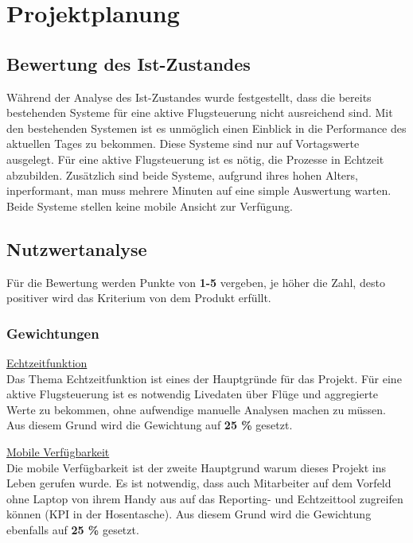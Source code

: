 \section{Projektplanung}

	\subsection{Bewertung des Ist-Zustandes}
	Während der Analyse des Ist-Zustandes wurde festgestellt, dass die bereits bestehenden Systeme für eine aktive Flugsteuerung nicht ausreichend sind. Mit den bestehenden Systemen ist es unmöglich einen Einblick in die Performance des aktuellen Tages zu bekommen. Diese Systeme sind nur auf Vortagswerte ausgelegt. Für eine aktive Flugsteuerung ist es nötig, die Prozesse in Echtzeit abzubilden. Zusätzlich sind beide Systeme, aufgrund ihres hohen Alters, inperformant, man muss mehrere Minuten auf eine simple Auswertung warten. Beide Systeme stellen keine mobile Ansicht zur Verfügung.


	
	\subsection{Nutzwertanalyse}
	Für die Bewertung werden Punkte von \textbf{1-5} vergeben, je höher die Zahl, desto positiver wird das Kriterium von dem Produkt erfüllt.

		\subsubsection{Gewichtungen}

		{
			\underline{Echtzeitfunktion}\\
			Das Thema Echtzeitfunktion ist eines der Hauptgründe für das Projekt. Für eine aktive Flugsteuerung ist es notwendig Livedaten über Flüge und aggregierte Werte zu bekommen, ohne aufwendige manuelle Analysen machen zu müssen. Aus diesem Grund wird die Gewichtung auf \textbf{25 \%} gesetzt.
		
		}

		\vspace{8pt}

		{
			\noindent
			\underline{Mobile Verfügbarkeit}\\
			Die mobile Verfügbarkeit ist der zweite Hauptgrund warum dieses Projekt ins Leben gerufen wurde. Es ist notwendig, dass auch Mitarbeiter auf dem Vorfeld ohne Laptop von ihrem Handy aus auf das Reporting- und Echtzeittool zugreifen können (KPI in der Hosentasche). Aus diesem Grund wird die Gewichtung ebenfalls auf \textbf{25 \%} gesetzt.
		}

